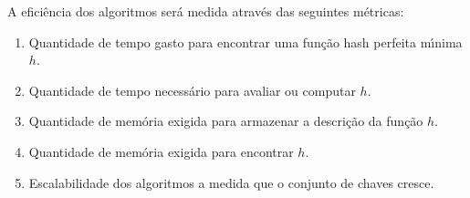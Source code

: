 A efici\^encia dos algoritmos ser\'a medida atrav\'es das seguintes m\'etricas:
\begin{enumerate}
\item Quantidade de tempo gasto para encontrar uma fun\c{c}\~ao hash perfeita m\'{\i}nima $h$.
\item Quantidade de tempo necess\'ario para avaliar ou computar $h$.
\item Quantidade de mem\'oria exigida para armazenar a descri\c{c}\~ao da fun\c{c}\~ao $h$.
\item Quantidade de mem\'oria exigida para encontrar $h$.  
\item Escalabilidade dos algoritmos a medida que o conjunto de chaves cresce. 
\end{enumerate}

